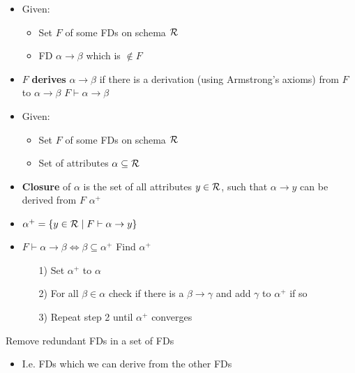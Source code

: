\begin{itemize}
\begin{itemize}
            \item Given:
                \begin{itemize}
                    \item Set $F$ of some FDs on schema $\mathcal{R}$
                    \item FD $\alpha \to \beta$ which is $\not\in F$
                \end{itemize}
            \item $F$ \textbf{derives} $\alpha \to \beta$ if there is a derivation (using Armstrong's axioms) from $F$ to $\alpha \to \beta$
             $F \vdash \alpha \to \beta$
        \end{itemize}
        \begin{itemize}
            \item Given:
                \begin{itemize}
                    \item Set $F$ of some FDs on schema $\mathcal{R}$
                    \item Set of attributes $\alpha \subseteq \mathcal{R}$
                \end{itemize}
            \item \textbf{Closure} of $\alpha$ is the set of all attributes $y \in \mathcal{R}$, such that $\alpha \to y$ can be derived from $F$
             $\alpha^+$
            \item $\alpha^+ = \{y \in \mathcal{R} \mid F \vdash \alpha \to y\}$
            \item $F \vdash \alpha \to \beta \iff \beta \subseteq \alpha^+$
             Find $\alpha^+$
                \begin{itemize}
                    \item[1)] Set $\alpha^+$ to $\alpha$
                    \item[2)] For all $\beta \in \alpha$ check if there is a $\beta \to \gamma$ and add $\gamma$ to $\alpha^+$ if so
                    \item[3)] Repeat step 2 until $\alpha^+$ converges
                \end{itemize}
        \end{itemize}
        \begin{itemize}
             Remove redundant FDs in a set of FDs
                \begin{itemize}
                    \item I.e. FDs which we can derive from the other FDs

\end{itemize}
\end{itemize}
\end{itemize}
